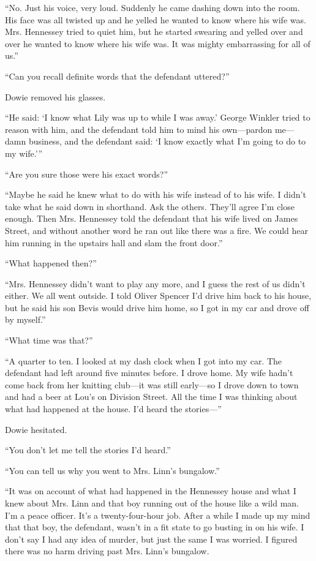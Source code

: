 \documentclass{novel}
\begin{document}
“No. Just his voice, very loud. Suddenly he came dashing down into the room. His face was all twisted up and he yelled he wanted to know where his wife was. Mrs. Hennessey tried to quiet him, but he started swearing and yelled over and over he wanted to know where his wife was. It was mighty embarrassing for all of us.”

“Can you recall definite words that the defendant uttered?”

\scenestars

Dowie removed his glasses.

“He said: ‘I know what Lily was up to while I was away.’ George Winkler tried to reason with him, and the defendant told him to mind his own—pardon me—damn business, and the defendant said: ‘I know exactly what I’m going to do to my wife.’”

“Are you sure those were his exact words?”

“Maybe he said he knew what to do with his wife instead of to his wife. I didn’t take what he said down in shorthand. Ask the others. They’ll agree I’m close enough. Then Mrs. Hennessey told the defendant that his wife lived on James Street, and without another word he ran out like there was a fire. We could hear him running in the upstairs hall and slam the front door.”

“What happened then?”

“Mrs. Hennessey didn’t want to play any more, and I guess the rest of us didn’t either. We all went outside. I told Oliver Spencer I’d drive him back to his house, but he said his son Bevis would drive him home, so I got in my car and drove off by myself.”

“What time was that?”

“A quarter to ten. I looked at my dash clock when I got into my car. The defendant had left around five minutes before. I drove home. My wife hadn’t come back from her knitting club—it was still early—so I drove down to town and had a beer at Lou’s on Division Street. All the time I was thinking about what had happened at the house. I’d heard the stories—”

Dowie hesitated.

“You don’t let me tell the stories I’d heard.”

“You can tell us why you went to Mrs. Linn’s bungalow.”

“It was on account of what had happened in the Hennessey house and what I knew about Mrs. Linn and that boy running out of the house like a wild man. I’m a peace officer. It’s a twenty-four-hour job. After a while I made up my mind that that boy, the defendant, wasn’t in a fit state to go busting in on his wife. I don’t say I had any idea of murder, but just the same I was worried. I figured there was no harm driving past Mrs. Linn’s bungalow.
\end{document}
